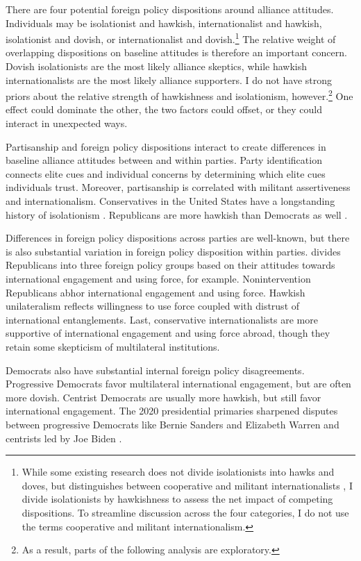 \documentclass[12pt]{article}
\begin{document}
There are four potential foreign policy dispositions around alliance attitudes.
Individuals may be isolationist and hawkish, internationalist and hawkish, isolationist and dovish, or internationalist and dovish.\footnote{While some existing research does not divide isolationists into hawks and doves, but distinguishes between cooperative and militant internationalists \citep{Kertzeretal2014}, I divide isolationists by hawkishness to assess the net impact of competing dispositions. To streamline discussion across the four categories, I do not use the terms cooperative and militant internationalism.}
The relative weight of overlapping dispositions on baseline attitudes is therefore an important concern. 
Dovish isolationists are the most likely alliance skeptics, while hawkish internationalists are the most likely alliance supporters. 
I do not have strong priors about the relative strength of hawkishness and isolationism, however.\footnote{As a result, parts of the following analysis are exploratory.}
One effect could dominate the other, the two factors could offset, or they could interact in unexpected ways.


Partisanship and foreign policy dispositions interact to create differences in baseline alliance attitudes between and within parties. 
Party identification connects elite cues and individual concerns by determining which elite cues individuals trust.
Moreover, partisanship is correlated with militant assertiveness and internationalism. 
Conservatives in the United States have a longstanding history of isolationism \citep{Kupchan2020}.
Republicans are more hawkish than Democrats as well \citep{Gries2014}. 


Differences in foreign policy dispositions across parties are well-known, but there is also substantial variation in foreign policy disposition within parties.
\citet{Dueck2019} divides Republicans into three foreign policy groups based on their attitudes towards international engagement and using force, for example.
Nonintervention Republicans abhor international engagement and using force.
Hawkish unilateralism reflects willingness to use force coupled with distrust of international entanglements. 
Last, conservative internationalists are more supportive of international engagement and using force abroad, though they retain some skepticism of multilateral institutions.


Democrats also have substantial internal foreign policy disagreements. 
Progressive Democrats favor multilateral international engagement, but are often more dovish.
Centrist Democrats are usually more hawkish, but still favor international engagement. 
The 2020 presidential primaries sharpened disputes between progressive Democrats like Bernie Sanders and Elizabeth Warren and centrists led by Joe Biden \citep{Robinson2019demfp}. 
\end{document}
